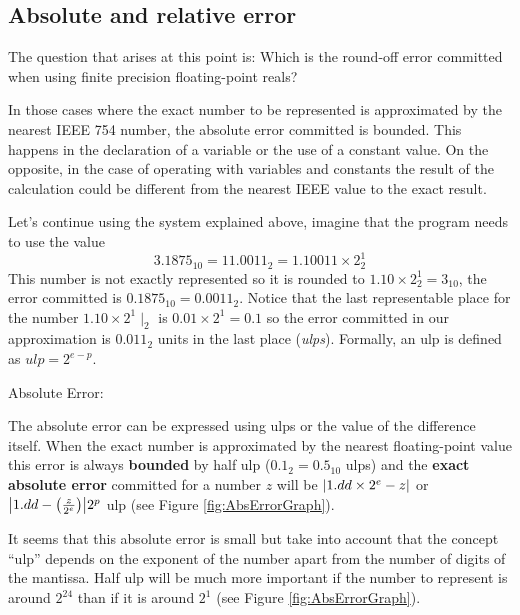         \subsection{Absolute and relative error}


The question that arises at this point is: Which is the round-off error committed when using finite precision floating-point reals?

In those cases where the exact number to be represented is approximated by the nearest IEEE 754 number, the absolute error committed is bounded. 
This happens in the declaration of a variable or the use of a constant value. 
On the opposite, in the case of operating with variables and constants the result of the calculation could be different from the nearest IEEE value to the exact result. 


Let's continue using the system explained above, imagine that the program needs to use the value 
$$
3.1875_{10} = 11.0011_2 = 1.10011\times 2^1_2
$$
This number is not exactly represented so it is rounded to $1.10\times2^1_2 = 3_{10}$, the error committed is $0.1875_{10} = 0.0011_2$. 
Notice that the last representable place for the number $1.10\times2^1\mid_2$ is $0.01\times2^1 = 0.1$ so the error committed in our approximation is $0.011_2$ units in the last place (\textit{ulps}). 
Formally, an ulp is defined as $ulp = 2^{e-p}$.



{\large Absolute Error:}

The absolute error can be expressed using ulps or the value of the difference itself. When the exact number is 
approximated by the nearest floating-point value this error is always \textbf{bounded} by half ulp ($0.1_2 = 0.5_{10}$ ulps) and the \textbf{exact absolute error} committed for a number 
$z$ will be $\abs{1.dd\times 2^e - z}$ or $\abs{1.dd - \left(  \frac{z}{2^e}  \right)}2^p$ ulp (see Figure \ref{fig:AbsErrorGraph}). 

It seems that this absolute error is small but take into account that the concept ``ulp'' depends on the exponent of the number apart from the number of digits of the mantissa. 
Half ulp will be much more important if the number to represent is around $2^{24}$ than if it is around $2^1$ (see Figure \ref{fig:AbsErrorGraph}). 



